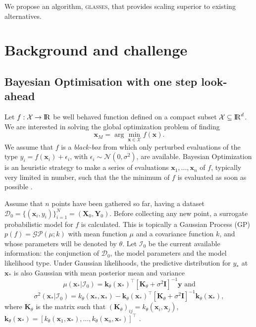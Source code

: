 \documentclass[twoside]{article}
\def\bbbr{{\rm I\!R}}
\newcommand{\I}{\mathcal{I}}
\newcommand{\bx}{\textbf{x}}
\newcommand{\bX}{\textbf{X}}
\newcommand{\bY}{\textbf{Y}}
\newcommand{\by}{\textbf{y}}
\newcommand{\bk}{\textbf{k}}
\newcommand{\bK}{\textbf{K}}
\newcommand{\data}{\mathcal{D}}
\newcommand{\acr}[1]{\textsc{#1}\xspace}
\newcommand{\us}{\acr{glasses}}
\begin{document}
We propose an algorithm, \us, that provides scaling superior to existing alternatives.


\section{Background and challenge}
\subsection{Bayesian Optimisation with one step look-ahead} %
\label{sec:bayesian_optimisation}


Let $f: {\mathcal X} \to \bbbr$ be well behaved function defined on a compact subset ${\mathcal X} \subseteq \bbbr^d$. We are interested in solving the global optimization problem of finding 
$$\bx_{M} = \arg \min_{\bx \in {\mathcal X}} f(\bx).$$ 
We assume that $f$ is a \emph{black-box} from which only perturbed evaluations of the type $y_i = f(\bx_i) + \epsilon_i$, with $\epsilon_i \sim\mathcal{N}(0,\sigma^2)$, are  available. Bayesian Optimization is an heuristic strategy to make a series of evaluations $\bx_1,\dots,\bx_n$ of $f$, typically very limited in number,  such that the the minimum of $f$ is evaluated as soon as possible \citep{Lizotte_2008,Jones_2001,Snoek*Larochelle*Adams_2012,Brochu*Cora*DeFreitas_2010}.

Assume that $n$ points have been gathered so far, having a dataset $\data_0 = \{(\bx_i,y_i)\}_{i=1}^N = (\bX_0,\bY_0)$. Before collecting any new point, a surrogate probabilistic model for $f$ is calculated. This is topically a Gaussian Process (GP) $p(f) = \mathcal{GP}(\mu; k)$ with mean function $\mu$ and a covariance function $k$, and whose parameters will be denoted by $\theta$.  Let $\I_0$ be the current available information: the conjunction of $\data_0$, the model parameters and the model likelihood type.  Under Gaussian likelihoods, the predictive distribution for $y_*$ at $\bx_*$ is also Gaussian with mean posterior mean and variance
$$\mu(\bx_{*}|\I_0) = \bk_{\theta}(\bx_*)^\top[\bK_{\theta} + \sigma^2 \textbf{I}]^{-1}\by \mbox{ and}$$
$$\sigma^2(\bx_*|\I_0)=k_{\theta}(\bx_*,\bx_*)-\bk_{\theta}(\bx_*)^\top[\bK_{\theta}+\sigma^2 \textbf{I}]^{-1}\bk_{\theta}(\bx_*),$$
where $\bK_{\theta}$ is the matrix such that $(\bK_{\theta})_{ij}=k_{\theta}(\bx_i,\bx_j)$,  $\bk_{\theta}(\bx_{*}) = [k_{\theta}(\bx_1,\bx_{*}),\dots,k_{\theta}(\bx_n,\bx_{*})]^\top$ \citep{Rasmussen:2005:GPM:1162254}.  
\end{document}

